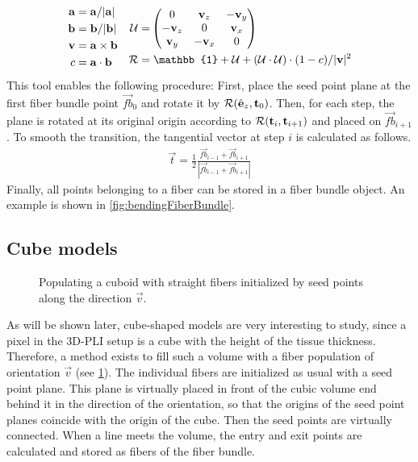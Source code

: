 \begin{align}
\begin{split}
    \vec{a} =& \; \vec{a} / |\vec{a}|\\
    \vec{b} =& \; \vec{b} / |\vec{b}|\\
    \vec{v} =& \; \vec{a} \times \vec{b}\\
    c =& \; \vec{a} \cdot \vec{b}
\end{split}
\quad
\begin{split}
    \mat{U} =& \begin{pmatrix} 0 & \vec{v}_z & -\vec{v}_y\\ -\vec{v}_z & 0 & \vec{v}_x\\ \vec{v}_y & -\vec{v}_x & 0\end{pmatrix}\\
    \mat{R} =& \; \mathbb{1} + \mat{U} + (\mat{U} \cdot \mat{U}) \cdot (1 - c) / |\vec{v}|^2
\end{split}
\end{align}
% 
This tool enables the following procedure:
First, place the seed point plane at the first fiber bundle point $\vec{fb}_0$ and rotate it by $\mathcal{R}(\hat{\mathbf{e}}_z, \mathbf{t}_0)$.
Then, for each step, the plane is rotated at its original origin according to $\mathcal{R}(\mathbf{t}_i, \mathbf{t}_{i+1})$ and placed on $\vec{fb}_{i+1}$.
To smooth the transition, the tangential vector at step $i$ is calculated as follows.
\begin{align}
    \vec{t} = \frac{1}{2} \frac{\vec{fb}_{i-1} + \vec{fb}_{i+1}}{|\vec{fb}_{i-1} + \vec{fb}_{i+1}|}
\end{align}
%
Finally, all points belonging to a fiber can be stored in a fiber bundle object.
An example is shown in \cref{fig:bendingFiberBundle}.
%
%
%
\subsection{Cube models} \label{sec:cubeModelBuilding}
%
\begin{figure}[!t]
    \centering
    \setlength{\tikzwidth}{0.5\textwidth}
	\caption{Populating a cuboid with straight fibers initialized by seed points along the direction $\vec{v}$.}
    \label{fig:cubeBuild}%
\end{figure}
%
As will be shown later, cube-shaped models are very interesting to study, since a pixel in the \ac{3D-PLI} setup is a cube with the height of the tissue thickness.
Therefore, a method exists to fill such a volume with a fiber population of orientation $\vec{v}$ (see \cref{fig:cubeBuild}).
The individual fibers are initialized as usual with a seed point plane.
This plane is virtually placed in front of the cubic volume end behind it in the direction of the orientation, so that the origins of the seed point planes coincide with the origin of the cube.
Then the seed points are virtually connected.
When a line meets the volume, the entry and exit points are calculated and stored as fibers of the fiber bundle.
%
%
%
